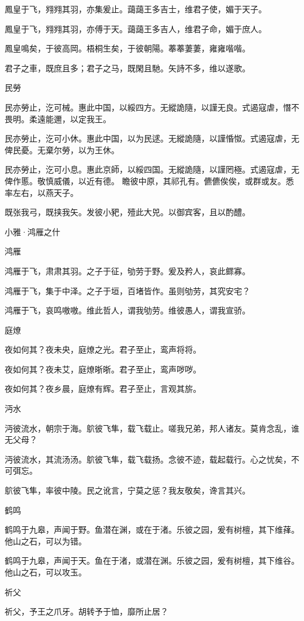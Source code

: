 鳳皇于飞，翙翙其羽，亦集爰止。藹藹王多吉士，维君子使，媚于天子。

鳳皇于飞，翙翙其羽，亦傅于天。藹藹王多吉人，维君子命，媚于庶人。

鳳皇鳴矣，于彼高岡。梧桐生矣，于彼朝陽。菶菶萋萋，雍雍喈喈。

君子之車，既庶且多；君子之马，既閑且馳。矢詩不多，维以遂歌。

民勞

民亦勞止，汔可械。惠此中国，以綏四方。无縱詭隨，以謹无良。式遏寇虐，憯不畏明。柔遠能邇，以定我王。

民亦勞止，汔可小休。惠此中国，以为民逑。无縱詭隨，以謹惛怓。式遏寇虐，无俾民憂。无棄尔勞，以为王休。

民亦勞止，汔可小息。惠此京師，以綏四国。无縱詭隨，以謹罔極。式遏寇虐，无俾作慝。敬慎威儀，以近有德。
瞻彼中原，其祁孔有。儦儦俟俟，或群或友。悉率左右，以燕天子。

既张我弓，既挟我矢。发彼小豝，殪此大兕。以御宾客，且以酌醴。




小雅·鸿雁之什


鸿雁

鸿雁于飞，肃肃其羽。之子于征，劬劳于野。爰及矜人，哀此鳏寡。

鸿雁于飞，集于中泽。之子于垣，百堵皆作。虽则劬劳，其究安宅？

鸿雁于飞，哀鸣嗷嗷。维此哲人，谓我劬劳。维彼愚人，谓我宣骄。

庭燎

夜如何其？夜未央，庭燎之光。君子至止，鸾声将将。

夜如何其？夜未艾，庭燎晣晣。君子至止，鸾声哕哕。

夜如何其？夜乡晨，庭燎有辉。君子至止，言观其旂。

沔水

沔彼流水，朝宗于海。鴥彼飞隼，载飞载止。嗟我兄弟，邦人诸友。莫肯念乱，谁无父母？

沔彼流水，其流汤汤。鴥彼飞隼，载飞载扬。念彼不迹，载起载行。心之忧矣，不可弭忘。

鴥彼飞隼，率彼中陵。民之讹言，宁莫之惩？我友敬矣，谗言其兴。

鹤鸣

鹤鸣于九皋，声闻于野。鱼潜在渊，或在于渚。乐彼之园，爰有树檀，其下维萚。他山之石，可以为错。

鹤鸣于九皋，声闻于天。鱼在于渚，或潜在渊。乐彼之园，爰有树檀，其下维谷。他山之石，可以攻玉。

祈父

祈父，予王之爪牙。胡转予于恤，靡所止居？

